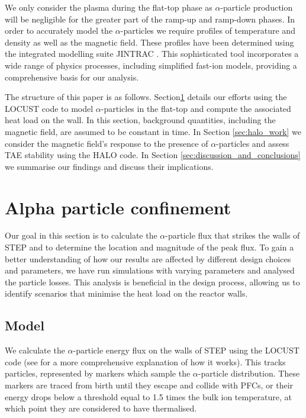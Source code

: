 \documentclass[10pt, a4paper, twoside]{article}
\begin{document}
We only consider the plasma during the flat-top phase as $\alpha$-particle production will be negligible for the greater part of the ramp-up and ramp-down phases. In order to accurately model the $\alpha$-particles we require profiles of temperature and density as well as the magnetic field. These profiles have been determined using the integrated modelling suite JINTRAC \cite{meyer2023, mitchell2023}. This sophisticated tool incorporates a wide range of physics processes, including simplified fast-ion models, providing a comprehensive basis for our analysis.

The structure of this paper is as follows. Section\ref{sec:locust_work} details our efforts using the LOCUST code to model $\alpha$-particles in the flat-top and compute the associated heat load on the wall. In this section, background quantities, including the magnetic field, are assumed to be constant in time. In Section \ref{sec:halo_work} we consider the magnetic field's response to the presence of $\alpha$-particles and assess TAE stability using the HALO code. In Section \ref{sec:discussion_and_conclusions} we summarise our findings and discuss their implications.

\section{Alpha particle confinement}
\label{sec:locust_work}

Our goal in this section is to calculate the $\alpha$-particle flux that strikes the walls of STEP and to determine the location and magnitude of the peak flux. To gain a better understanding of how our results are affected by different design choices and parameters, we have run simulations with varying parameters and analysed the particle losses. This analysis is beneficial in the design process, allowing us to identify scenarios that minimise the heat load on the reactor walls.

\subsection{Model}

We calculate the $\alpha$-particle energy flux on the walls of STEP using the LOCUST code (see \cite{akers2018, ward2021} for a more comprehensive explanation of how it works). This tracks particles, represented by markers which sample the $\alpha$-particle distribution. These markers are traced from birth until they escape and collide with PFCs, or their energy drops below a threshold equal to 1.5 times the bulk ion temperature, at which point they are considered to have thermalised. 
\end{document}
